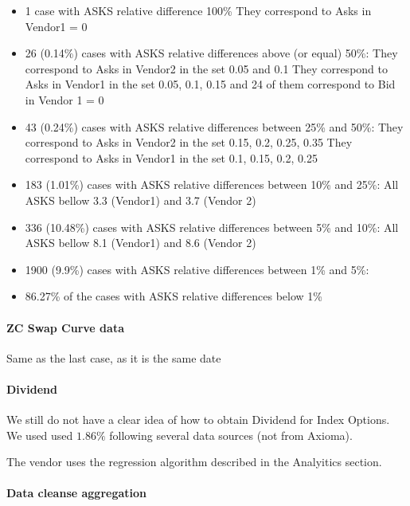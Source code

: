 \documentclass[11pt,confidential]{article}
\begin{document}
\begin{itemize}
\item 1 case with ASKS relative difference 100\%
	They correspond to Asks in Vendor1 = 0

\item 26 (0.14\%) cases with ASKS relative differences above (or equal) 50\%:
	They correspond to Asks in Vendor2 in the set 0.05 and 0.1
	They correspond to Asks in Vendor1 in the set 0.05, 0.1, 0.15 and 24  of them correspond to Bid in Vendor 1 = 0

\item 43 (0.24\%) cases with ASKS relative differences between 25\% and 50\%:
	They correspond to Asks in Vendor2 in the set 0.15, 0.2, 0.25, 0.35 
	They correspond to Asks in Vendor1 in the set 0.1, 0.15, 0.2, 0.25 

\item 183 (1.01\%) cases with ASKS relative differences between 10\% and 25\%:
	All ASKS bellow 3.3 (Vendor1) and 3.7 (Vendor 2)

\item 336 (10.48\%) cases with ASKS relative differences between 5\% and 10\%:
	All ASKS bellow 8.1 (Vendor1) and 8.6 (Vendor 2)

\item 1900 (9.9\%) cases with ASKS relative differences between 1\% and 5\%:

\item 86.27\%  of the cases with ASKS relative differences below 1\%
\end{itemize}



\paragraph{ZC Swap Curve data}

Same as the last case, as it is the same date


\paragraph{Dividend}

We still do not have a clear idea of how to obtain Dividend for Index Options.
We used used $1.86\%$ following several data sources (not from Axioma). 

The vendor uses the regression algorithm described in the Analyitics section.



\paragraph{Data cleanse aggregation}
\end{document}
